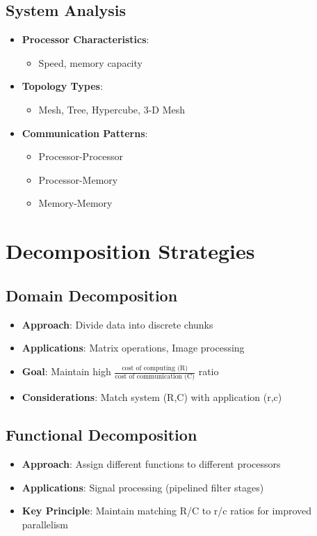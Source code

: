 \documentclass[12pt]{article}
\begin{document}
\subsection{System Analysis}
\begin{itemize}
\item \textbf{Processor Characteristics}:
  \begin{itemize}
  \item Speed, memory capacity
  \end{itemize}
  
\item \textbf{Topology Types}:
  \begin{itemize}
  \item Mesh, Tree, Hypercube, 3-D Mesh
  \end{itemize}
  
\item \textbf{Communication Patterns}:
  \begin{itemize}
  \item Processor-Processor
  \item Processor-Memory
  \item Memory-Memory
  \end{itemize}
\end{itemize}

\section{Decomposition Strategies}

\subsection{Domain Decomposition}
\begin{itemize}
\item \textbf{Approach}: Divide data into discrete chunks
\item \textbf{Applications}: Matrix operations, Image processing
\item \textbf{Goal}: Maintain high $\frac{\text{cost of computing (R)}}{\text{cost of communication (C)}}$ ratio
\item \textbf{Considerations}: Match system (R,C) with application (r,c)
\end{itemize}

\subsection{Functional Decomposition}
\begin{itemize}
\item \textbf{Approach}: Assign different functions to different processors
\item \textbf{Applications}: Signal processing (pipelined filter stages)
\item \textbf{Key Principle}: Maintain matching R/C to r/c ratios for improved parallelism
\end{itemize}
\end{document}
